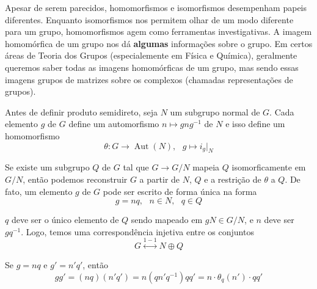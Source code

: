 \documentclass[a4paper,portuguese,11pt,twoside, leqno]{book}
\DeclareMathOperator{\aut}{Aut}
\theoremstyle{definition}
\begin{document}
	\par\vspace{0.3cm} Apesar de serem parecidos, homomorfismos e isomorfismos desempenham papeis diferentes. Enquanto isomorfismos nos permitem olhar de um modo diferente para um grupo, homomorfismos agem como ferramentas investigativas. A imagem homomórfica de um grupo nos dá \textbf{algumas} informações sobre o grupo. Em certos áreas de Teoria dos Grupos (especialemente em Física e Química), geralmente queremos saber todas as imagens homomórficas de um grupo, mas sendo essas imagens grupos de matrizes sobre os complexos (chamadas representações de grupos). 
	
	\par\vspace{0.3cm} Antes de definir produto semidireto, seja $N$ um subgrupo normal de $G$. Cada elemento $g$ de $G$ define um automorfismo $n\mapsto gng^{-1}$ de $N$ e isso define um homomorfismo
	\begin{equation*}
	\theta: G\to \aut(N), \text{ }g\mapsto i_g|_N
	\end{equation*}
	\par\vspace{0.3cm} Se existe um subgrupo $Q$ de $G$ tal que $G\to G/N$ mapeia $Q$ isomorficamente em $G/N$, então podemos reconstruir $G$ a partir de $N$, $Q$ e a restrição de $\theta$ a $Q$. De fato, um elemento $g$ de $G$ pode ser escrito de forma única na forma
	\begin{equation*}
	g=nq, \text{ }n\in N, \text{ }q\in Q
	\end{equation*}
	\par\vspace{0.3cm} $q$ deve ser o único elemento de $Q$ sendo mapeado em $gN\in G/N$, e $n$ deve ser $gq^{-1}$. Logo, temos uma correspondência injetiva entre os conjuntos 
	\begin{equation*}
	G\overset{1-1}{\longleftrightarrow} N\oplus Q
	\end{equation*} 
	\par\vspace{0.3cm} Se $g=nq$ e $g'=n'q'$, então
	\begin{equation*}
	gg' = (nq)(n'q') = n(qn'q^{-1})qq' = n\cdot\theta_q(n')\cdot qq'
	\end{equation*}
	
\end{document}

